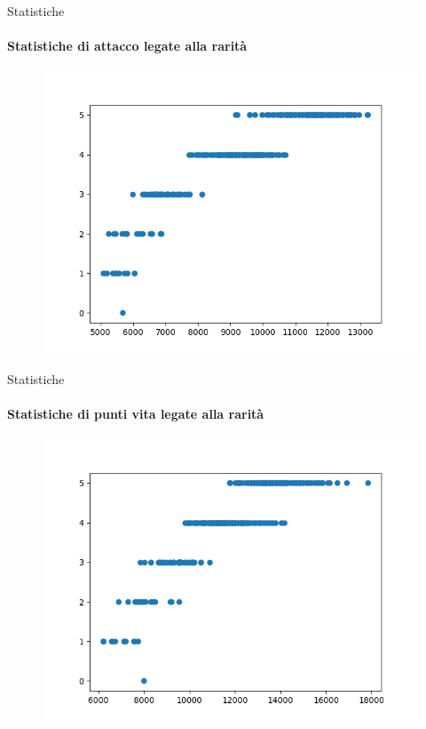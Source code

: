 \documentclass{beamer}
\begin{document}
\begin{darkframes}
  \begin{frame}{Statistiche}
    \framesubtitle{Statistiche di attacco legate alla rarità}
    \begin{figure}
      \centering
      \includegraphics[scale=0.55]{./images/class_and_stats_atk.png}
    \end{figure}
  \end{frame}

  \begin{frame}{Statistiche}
    \framesubtitle{Statistiche di punti vita legate alla rarità}
    \begin{figure}
      \centering
      \includegraphics[scale=0.55]{./images/class_and_stats_hp.png}
    \end{figure}
  \end{frame}


\end{darkframes}
\end{document}
